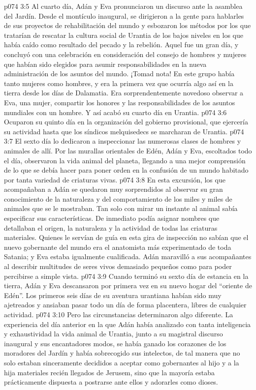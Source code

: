 \vs p074 3:5 \pc Al cuarto día, Adán y Eva pronunciaron un discurso ante la asamblea del Jardín. Desde el montículo inaugural, se dirigieron a la gente para hablarles de sus proyectos de rehabilitación del mundo y esbozaron los métodos por los que tratarían de rescatar la cultura social de Urantia de los bajos niveles en los que había caído como resultado del pecado y la rebelión. Aquel fue un gran día, y concluyó con una celebración en consideración del consejo de hombres y mujeres que habían sido elegidos para asumir responsabilidades en la nueva administración de los asuntos del mundo. ¡Tomad nota! En este grupo había tanto mujeres como hombres, y era la primera vez que ocurría algo así en la tierra desde los días de Dalamatia. Era sorprendentemente novedoso observar a Eva, una mujer, compartir los honores y las responsabilidades de los asuntos mundiales con un hombre. Y así acabó su cuarto día en Urantia.
\vs p074 3:6 \pc Ocuparon su quinto día en la organización del gobierno provisional, que ejercería su actividad hasta que los síndicos melquisedecs se marcharan de Urantia.
\vs p074 3:7 \pc El sexto día lo dedicaron a inspeccionar las numerosas clases de hombres y animales de allí. Por las murallas orientales de Edén, Adán y Eva, escoltados todo el día, observaron la vida animal del planeta, llegando a una mejor comprensión de lo que se debía hacer para poner orden en la confusión de un mundo habitado por tanta variedad de criaturas vivas.
\vs p074 3:8 En esta excursión, los que acompañaban a Adán se quedaron muy sorprendidos al observar su gran conocimiento de la naturaleza y del comportamiento de los miles y miles de animales que se le mostraban. Tan solo con mirar un instante al animal sabía especificar sus características. De inmediato podía asignar nombres que detallaban el origen, la naturaleza y la actividad de todas las criaturas materiales. Quienes le servían de guía en esta gira de inspección no sabían que el nuevo gobernante del mundo era el anatomista más experimentado de toda Satania; y Eva estaba igualmente cualificada. Adán maravilló a sus acompañantes al describir multitudes de seres vivos demasiado pequeños como para poder percibirse a simple vista.
\vs p074 3:9 Cuando terminó su sexto día de estancia en la tierra, Adán y Eva descansaron por primera vez en su nuevo hogar del “oriente de Edén”. Los primeros seis días de su aventura urantiana habían sido muy ajetreados y ansiaban pasar todo un día de forma placentera, libres de cualquier actividad.
\vs p074 3:10 Pero las circunstancias determinaron algo diferente. La experiencia del día anterior en la que Adán había analizado con tanta inteligencia y exhaustividad la vida animal de Urantia, junto a su magistral discurso inaugural y sus encantadores modos, se había ganado los corazones de los moradores del Jardín y había sobrecogido sus intelectos, de tal manera que no solo estaban sinceramente decididos a aceptar como gobernantes al hijo y a la hija materiales recién llegados de Jerusem, sino que la mayoría estaba prácticamente dispuesta a postrarse ante ellos y adorarles como dioses.
